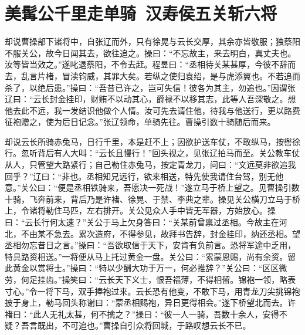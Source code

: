 \chapter{美髯公千里走单骑~汉寿侯五关斩六将}

却说曹操部下诸将中，自张辽而外，只有徐晃与云长交厚，其余亦皆敬服；独蔡阳不服关公，故今日闻其去，欲往追之。操曰：“不忘故主，来去明白，真丈夫也。汝等皆当效之。”遂叱退蔡阳，不令去赶。程昱曰：“丞相待关某甚厚，今彼不辞而去，乱言片楮，冒渎钧威，其罪大矣。若纵之使归袁绍，是与虎添翼也。不若追而杀了，以绝后患。”操曰：“吾昔已许之，岂可失信！彼各为其主，勿追也。”因谓张辽曰：“云长封金挂印，财贿不以动其心，爵禄不以移其志，此等人吾深敬之。想他去此不远，我一发结识他做个人情。汝可先去请住他，待我与他送行，更以路费征袍赠之，使为后日记念。”张辽领命，单骑先往。曹操引数十骑随后而来。

却说云长所骑赤兔马，日行千里，本是赶不上；因欲护送车仗，不敢纵马，按辔徐行。忽听背后有人大叫：“云长且慢行！”回头视之，见张辽拍马而至。关公教车仗从人，只管望大路紧行；自己勒住赤兔马，按定青龙刀，问曰：“文远莫非欲追我回乎？”辽曰：“非也。丞相知兄远行，欲来相送，特先使我请住台驾，别无他意。”关公曰：“便是丞相铁骑来，吾愿决一死战！”遂立马于桥上望之。见曹操引数十骑，飞奔前来，背后乃是许褚、徐晃、于禁、李典之辈。操见关公横刀立马于桥上，令诸将勒住马匹，左右排开。关公见众人手中皆无军器，方始放心。操曰：“云长行何太速？”关公于马上欠身答曰：“关某前曾禀过丞相。今故主在河北，不由某不急去。累次造府，不得参见，故拜书告辞，封金挂印，纳还丞相。望丞相勿忘昔日之言。”操曰：“吾欲取信于天下，安肯有负前言。恐将军途中乏用，特具路资相送。”一将便从马上托过黄金一盘。关公曰：“累蒙恩赐，尚有余资。留此黄金以赏将士。”操曰：“特以少酬大功于万一，何必推辞？”关公曰：“区区微劳，何足挂齿。”操笑曰：“云长天下义士，恨吾福薄，不得相留。锦袍一领，略表寸心。”令一将下马，双手捧袍过来。云长恐有他变，不敢下马，用青龙刀尖挑锦袍披于身上，勒马回头称谢曰：“蒙丞相赐袍，异日更得相会。”遂下桥望北而去。许褚曰：“此人无礼太甚，何不擒之？”操曰：“彼一人一骑，吾数十余人，安得不疑？吾言既出，不可追也。”曹操自引众将回城，于路叹想云长不已。

